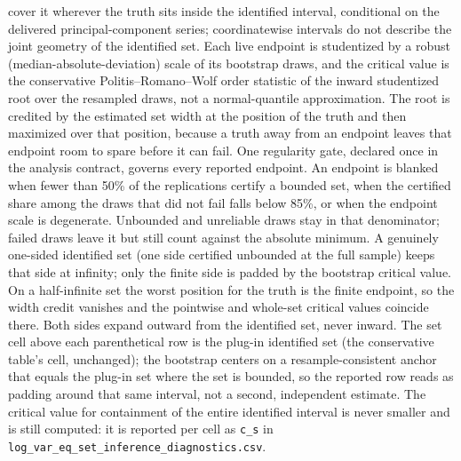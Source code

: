 \begin{table}[!htbp]
\begin{threeparttable}
\begin{tablenotes}[flushleft]
cover it wherever the truth sits inside the identified interval, conditional on the delivered principal-component series; coordinatewise intervals do not describe the joint geometry of the identified set. Each live endpoint is studentized by a robust (median-absolute-deviation) scale of its bootstrap draws, and the critical value is the conservative Politis--Romano--Wolf order statistic of the inward studentized root over the resampled draws, not a normal-quantile approximation. The root is credited by the estimated set width at the position of the truth and then maximized over that position, because a truth away from an endpoint leaves that endpoint room to spare before it can fail. One regularity gate, declared once in the analysis contract, governs every reported endpoint. An endpoint is blanked when fewer than 50\% of the replications certify a bounded set, when the certified share among the draws that did not fail falls below 85\%, or when the endpoint scale is degenerate. Unbounded and unreliable draws stay in that denominator; failed draws leave it but still count against the absolute minimum. A genuinely one-sided identified set (one side certified unbounded at the full sample) keeps that side at infinity; only the finite side is padded by the bootstrap critical value. On a half-infinite set the worst position for the truth is the finite endpoint, so the width credit vanishes and the pointwise and whole-set critical values coincide there. Both sides expand outward from the identified set, never inward. The set cell above each parenthetical row is the plug-in identified set (the conservative table's cell, unchanged); the bootstrap centers on a resample-consistent anchor that equals the plug-in set where the set is bounded, so the reported row reads as padding around that same interval, not a second, independent estimate. The critical value for containment of the entire identified interval is never smaller and is still computed: it is reported per cell as \texttt{c\_s} in \texttt{log\_var\_eq\_set\_inference\_diagnostics.csv}.
\end{tablenotes}
\end{threeparttable}
\end{table}
\clearpage
